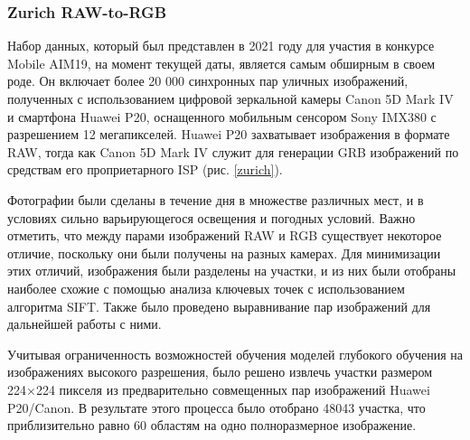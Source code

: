 \subsubsection{Zurich RAW-to-RGB}

Набор данных, который был представлен в 2021 году для участия в конкурсе Mobile AIM19, на момент текущей даты, является самым обширным в своем роде. Он включает более 20 000 синхронных пар уличных изображений, полученных с использованием цифровой зеркальной камеры Canon 5D Mark IV и смартфона Huawei P20, оснащенного мобильным сенсором Sony IMX380 с разрешением 12 мегапикселей. Huawei P20 захватывает изображения в формате RAW, тогда как Canon 5D Mark IV служит для генерации GRB изображений по средствам его проприетарного ISP (рис. \ref{zurich}).


Фотографии были сделаны в течение дня в множестве различных мест, и в условиях сильно варьирующегося освещения и погодных условий. Важно отметить, что между парами изображений RAW и RGB существует некоторое отличие, поскольку они были получены на разных камерах. Для минимизации этих отличий, изображения были разделены на участки, и из них были отобраны наиболее схожие с помощью анализа ключевых точек с использованием алгоритма SIFT. Также было проведено выравнивание пар изображений для дальнейшей работы с ними.

Учитывая ограниченность возможностей обучения моделей глубокого обучения на изображениях высокого разрешения, было решено извлечь участки размером 224×224 пикселя из предварительно совмещенных пар изображений Huawei P20/Canon. В результате этого процесса было отобрано 48043 участка, что приблизительно равно 60 областям на одно полноразмерное изображение.